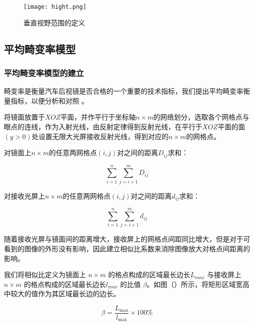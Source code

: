 \documentclass[withoutpreface,bwprint]{cumcmthesis} %
\begin{document}
\begin{figure}[!htb]
\centering
\texttt{[image: hight.png]}
\caption{垂直视野范围的定义}
\label{hight}
\end{figure}

\subsection{平均畸变率模型}
\subsubsection{平均畸变率模型的建立}

\par 畸变率是衡量汽车后视镜是否合格的一个重要的技术指标，我们提出平均畸变率衡量指标，以便分析和对照 。

\par 将镜面放置于$XOZ$平面，并作平行于坐标轴$n \times m$的网络划分，选取各个网格点与眼点的连线，作为入射光线，由反射定律得到反射光线，在平行于$XOZ$平面的面$(y>0)$处设置无限大光屏接收反射光线，得到对应的$n \times m$的网格点。
\par 对镜面上$n \times m$的任意两网格点$(i,j)$对之间的距离$D_{ij}$求和：

\begin{equation}
	\sum\limits_{i = 1}^{n}\sum\limits_{j = i + 1}^{m} D_{ij}
\end{equation} 

\par 对接收光屏上$n \times m$的任意两网格点$(i,j)$对之间的距离$d_{ij}$求和：

\begin{equation}
	\sum\limits_{i = 1}^{n}\sum\limits_{j = i + 1}^{m} d_{ij}
\end{equation}

\par 随着接收光屏与镜面间的距离增大，接收屏上的网格点间距同比增大，但是对于可看到的图像的外形没有影响，因此建立相似比系数来消除图像放大对格点间距离的影响。

\par 我们将相似比定义为镜面上 $n \times m$ 的格点构成的区域最长边长$L_{max}$ 与接收屏上 $n \times m$ 的格点构成的区域最长边长$l_{max}$ 的比值 $\beta$。如图（）所示，将矩形区域宽高中较大的值作为其区域最长边的边长。

\begin{equation}
	\beta = \frac{L_{\mathop{max}}}{l_{\mathop{max}}} \times 100 \%
\end{equation}
\end{document}
